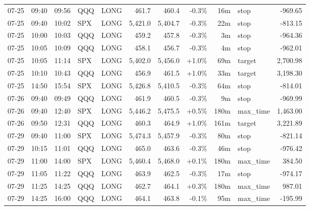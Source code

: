 \documentclass[11pt,a4paper,twoside]{article}
\begin{document}
\begin{center}
\begin{longtable}{>{\color{txtmain}}l l l l l r r r r >{\color{txtmain}}l r}
07-25 & 09:40 & 09:56 & QQQ & LONG & 461.7 & 460.4 & \textcolor{lossred}{-0.3\%} & 16m & stop & \textcolor{lossred}{-969.65} \\
07-25 & 09:40 & 10:02 & SPX & LONG & 5,421.0 & 5,404.7 & \textcolor{lossred}{-0.3\%} & 22m & stop & \textcolor{lossred}{-813.15} \\
07-25 & 10:00 & 10:03 & QQQ & LONG & 459.2 & 457.8 & \textcolor{lossred}{-0.3\%} & 3m & stop & \textcolor{lossred}{-964.36} \\
07-25 & 10:05 & 10:09 & QQQ & LONG & 458.1 & 456.7 & \textcolor{lossred}{-0.3\%} & 4m & stop & \textcolor{lossred}{-962.01} \\
07-25 & 10:05 & 11:14 & SPX & LONG & 5,402.0 & 5,456.0 & \textcolor{wingreen}{+1.0\%} & 69m & target & \textcolor{wingreen}{2,700.98} \\
07-25 & 10:10 & 10:43 & QQQ & LONG & 456.9 & 461.5 & \textcolor{wingreen}{+1.0\%} & 33m & target & \textcolor{wingreen}{3,198.30} \\
07-25 & 14:50 & 15:54 & SPX & LONG & 5,426.8 & 5,410.5 & \textcolor{lossred}{-0.3\%} & 64m & stop & \textcolor{lossred}{-814.01} \\
07-26 & 09:40 & 09:49 & QQQ & LONG & 461.9 & 460.5 & \textcolor{lossred}{-0.3\%} & 9m & stop & \textcolor{lossred}{-969.99} \\
07-26 & 09:40 & 12:40 & SPX & LONG & 5,446.2 & 5,475.5 & \textcolor{wingreen}{+0.5\%} & 180m & max\_time & \textcolor{wingreen}{1,463.00} \\
07-26 & 09:50 & 12:31 & QQQ & LONG & 460.3 & 464.9 & \textcolor{wingreen}{+1.0\%} & 161m & target & \textcolor{wingreen}{3,221.89} \\
07-29 & 09:40 & 11:00 & SPX & LONG & 5,474.3 & 5,457.9 & \textcolor{lossred}{-0.3\%} & 80m & stop & \textcolor{lossred}{-821.14} \\
07-29 & 10:15 & 11:01 & QQQ & LONG & 465.0 & 463.6 & \textcolor{lossred}{-0.3\%} & 46m & stop & \textcolor{lossred}{-976.42} \\
07-29 & 11:00 & 14:00 & SPX & LONG & 5,460.4 & 5,468.0 & \textcolor{wingreen}{+0.1\%} & 180m & max\_time & \textcolor{wingreen}{384.50} \\
07-29 & 11:05 & 11:22 & QQQ & LONG & 463.9 & 462.5 & \textcolor{lossred}{-0.3\%} & 17m & stop & \textcolor{lossred}{-974.17} \\
07-29 & 11:25 & 14:25 & QQQ & LONG & 462.7 & 464.1 & \textcolor{wingreen}{+0.3\%} & 180m & max\_time & \textcolor{wingreen}{987.01} \\
07-29 & 14:25 & 16:00 & QQQ & LONG & 464.1 & 463.8 & \textcolor{lossred}{-0.1\%} & 95m & max\_time & \textcolor{lossred}{-195.99} \\

\end{longtable}
\end{center}
\end{document}

